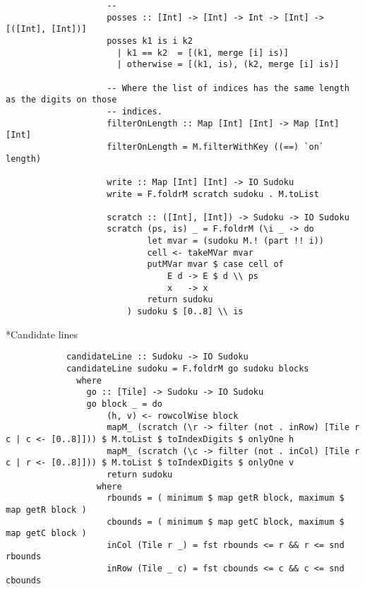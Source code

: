 \documentclass[a4paper,12pt]{article}
\begin{document}
\begin{section}
\begin{subsection}
\begin{subsubsection}
\begin{lstlisting}
                    --
                    posses :: [Int] -> [Int] -> Int -> [Int] -> [([Int], [Int])]
                    posses k1 is i k2
                      | k1 == k2  = [(k1, merge [i] is)]
                      | otherwise = [(k1, is), (k2, merge [i] is)]

                    -- Where the list of indices has the same length as the digits on those
                    -- indices.
                    filterOnLength :: Map [Int] [Int] -> Map [Int] [Int]
                    filterOnLength = M.filterWithKey ((==) `on` length)

                    write :: Map [Int] [Int] -> IO Sudoku
                    write = F.foldrM scratch sudoku . M.toList

                    scratch :: ([Int], [Int]) -> Sudoku -> IO Sudoku
                    scratch (ps, is) _ = F.foldrM (\i _ -> do
                            let mvar = (sudoku M.! (part !! i))
                            cell <- takeMVar mvar
                            putMVar mvar $ case cell of
                                E d -> E $ d \\ ps
                                x   -> x
                            return sudoku
                        ) sudoku $ [0..8] \\ is
            \end{lstlisting}

        \end{subsubsection}


        \begin{subsubsection}*{Candidate lines}

            \begin{lstlisting}
            candidateLine :: Sudoku -> IO Sudoku
            candidateLine sudoku = F.foldrM go sudoku blocks
              where
                go :: [Tile] -> Sudoku -> IO Sudoku
                go block _ = do
                    (h, v) <- rowcolWise block
                    mapM_ (scratch (\r -> filter (not . inRow) [Tile r c | c <- [0..8]])) $ M.toList $ toIndexDigits $ onlyOne h
                    mapM_ (scratch (\c -> filter (not . inCol) [Tile r c | r <- [0..8]])) $ M.toList $ toIndexDigits $ onlyOne v
                    return sudoku
                  where
                    rbounds = ( minimum $ map getR block, maximum $ map getR block )
                    cbounds = ( minimum $ map getC block, maximum $ map getC block )
                    inCol (Tile r _) = fst rbounds <= r && r <= snd rbounds
                    inRow (Tile _ c) = fst cbounds <= c && c <= snd cbounds


\end{lstlisting}
\end{subsubsection}
\end{subsection}
\end{section}
\end{document}
